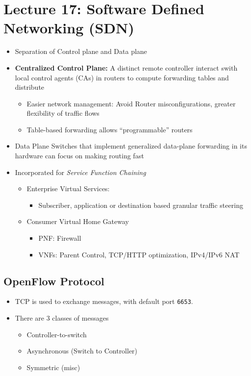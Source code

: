 \documentclass[a4paper]{article}
\begin{document}
\section{Lecture 17: Software Defined Networking (SDN)}
\begin{itemize}
    \item Separation of Control plane and Data plane
    \item \textbf{Centralized Control Plane:} A distinct remote controller interact swith local control agents (CAs) in routers to compute forwarding tables and distribute
    \begin{itemize}[label=$\circ$]
        \item Easier network management: Avoid Router misconfigurations, greater flexibility of traffic flows
        \item Table-based forwarding allows ``programmable'' routers
    \end{itemize}
    \item Data Plane Switches that implement generalized data-plane forwarding in its hardware can focus on making routing fast
    \item Incorporated for \textit{Service Function Chaining}
    \begin{itemize}[label=$\circ$]
        \item Enterprise Virtual Services:
        \begin{itemize}[label=\tiny$\blacksquare$]
            \item Subscriber, application or destination based granular traffic steering
        \end{itemize}
        \item Consumer Virtual Home Gateway
        \begin{itemize}[label=\tiny$\blacksquare$]
            \item PNF: Firewall
            \item VNFs: Parent Control, TCP/HTTP optimization, IPv4/IPv6 NAT
            \end{itemize}
    \end{itemize}
\end{itemize}

\subsection{OpenFlow Protocol}
\begin{itemize}
    \item TCP is used to exchange messages, with default port \texttt{6653}.
    \item There are 3 classes of messages
    \begin{itemize}[label=$\circ$]
        \item Controller-to-switch
        \item Asynchronous (Switch to Controller)
        \item Symmetric (misc)
    \end{itemize}
\end{itemize}
\end{document}
